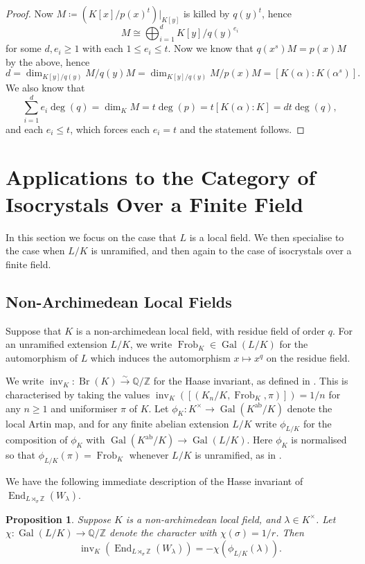 \documentclass[10pt, reqno, hidelinks]{amsart}
\DeclareMathOperator{\Gal}{Gal}
\DeclareMathOperator{\Br}{Br}
\DeclareMathOperator{\End}{End}
\DeclareMathOperator{\inv}{inv}
\DeclareMathOperator{\Frob}{Frob}
\DeclareMathOperator{\ab}{ab}
\newcommand{\bQ}{{\mathbb Q}}
\newcommand{\bZ}{{\mathbb Z}}
\numberwithin{thm}{subsection}
\newtheorem{prop}[thm]{Proposition}
\theoremstyle{definition}
\begin{document}
\begin{proof}
	Now $M \coloneqq (K[x] / p(x)^t)|_{K[y]}$ is killed by $q(y)^t$, hence 
	\[
		M \cong \bigoplus_{i = 1}^d K[y] / q(y)^{e_i}
	\]
	for some $d, e_i \geq 1$ with each $1 \leq e_i \leq t$. Now we know that $q(x^s)M = p(x)M$ by the above, hence 
	\[
		d = \dim_{K[y] / q(y)} M / q(y) M = \dim_{K[y] / q(y)} M / p(x) M = [K(\alpha) : K(\alpha^s)].
	\]
	We also know that
	\[
		\sum_{i = 1}^d e_i \deg(q) = \dim_K M = t \deg(p) = t [K(\alpha) : K] = d t\deg(q),
	\]
	and each $e_i \leq t$, which forces each $e_i = t$ and the statement follows. 
\end{proof}

\section{Applications to the Category of Isocrystals Over a Finite Field}\label{sect:localfields}

In this section we focus on the case that $L$ is a local field. We then specialise to the case when $L / K$ is unramified, and then again to the case of isocrystals over a finite field.

\subsection{Non-Archimedean Local Fields}

Suppose that $K$ is a non-archimedean local field, with residue field of order $q$. For an unramified extension $L / K$, we write $\Frob_K \in \Gal(L / K)$ for the automorphism of $L$ which induces the automorphism $x \mapsto x^q$ on the residue field.

We write $\inv_K \colon \Br(K) \xrightarrow{\sim} \bQ / \bZ$ for the Haase invariant, as defined in \cite[\S IV.4]{milneCFT}. This is characterised by taking the values $\inv_K([(K_n / K, \Frob_K, \pi)]) = 1/n$ for any $n \geq 1$ and uniformiser $\pi$ of $K$. Let $\phi_{K} \colon K^{\times} \rightarrow \Gal(K^{\ab} / K)$ denote the local Artin map, and for any finite abelian extension $L / K$ write $\phi_{L / K}$ for the composition of $\phi_K$ with $ \Gal(K^{\ab} / K) \rightarrow \Gal(L/K)$. Here $\phi_K$ is normalised so that $\phi_{L/K}(\pi) = \Frob_K$ whenever $L / K$ is unramified, as in \cite[\S III.3]{milneCFT}.

We have the following immediate description of the Hasse invariant of $\End_{L \rtimes_{\sigma} \bZ}(W_{\lambda})$.

\begin{prop}\label{prop:brauereltdesc}
Suppose $K$ is a non-archimedean local field, and $\lambda \in K^{\times}$. Let $\chi \colon \Gal(L/K) \rightarrow \bQ / \bZ$ denote the character with $\chi(\sigma) = 1/r$. Then
\[
\inv_K(\End_{L \rtimes_{\sigma} \bZ}(W_{\lambda})) = -\chi(\phi_{L/K}(\lambda)).
\]
\end{prop}
\end{document}
